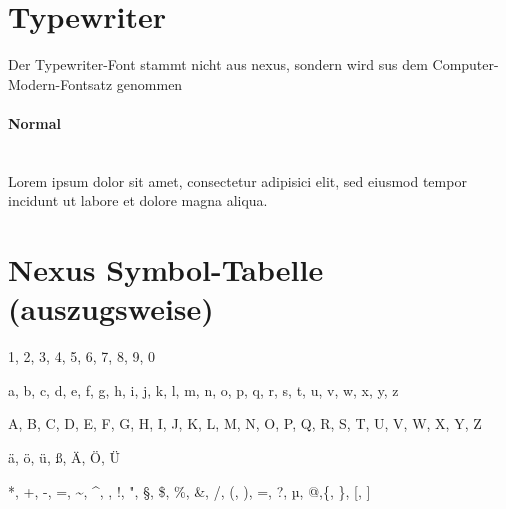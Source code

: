 \documentclass{scrartcl}
\begin{document}
\section*{Typewriter}

Der Typewriter-Font stammt nicht aus nexus, sondern wird sus dem
Computer-Modern-Fontsatz genommen


\paragraph{Normal}\hfill\\
{\ttfamily
Lorem ipsum dolor sit amet, consectetur adipisici elit, sed eiusmod tempor
incidunt ut labore et dolore magna aliqua.
}

\section*{Nexus Symbol-Tabelle {\normalsize\mdseries (auszugsweise)}}
{
\parindent0mm

1, 2, 3, 4, 5, 6, 7, 8, 9, 0

a, b, c, d, e, f, g, h, i, j, k, l, m, n, o, p, q, r, s, t, u, v, w, x, y, z

A, B, C, D, E, F, G, H, I, J, K, L, M, N, O, P, Q, R, S, T, U, V, W, X, Y, Z

ä, ö, ü, ß, Ä, Ö, Ü

*, +, -, =, \textasciitilde, \textasciicircum, , !, ", §, \$, \%, \&,
/, (, ), =, ?, µ, @,\{, \}, [, ]
}
\end{document}
